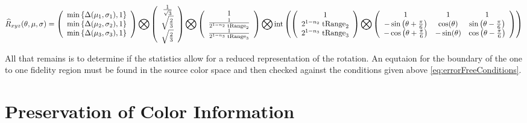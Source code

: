 \begin{equation}
\widehat{R}_{xyz}(\theta,\mu,\sigma) =
\left(
\begin{array}{c}
\min\left\{\Delta(\mu_1,\sigma_1), 1 \right\} \\
\min\left\{\Delta(\mu_2,\sigma_2), 1 \right\}  \\
\min\left\{\Delta(\mu_3,\sigma_3), 1 \right\}  \\
\end{array}
\right)
\bigotimes
\left(
\begin{array}{c}
 \frac{1}{\sqrt{3}} \\
 \sqrt{\frac{2}{3}}  \\
 \sqrt{\frac{2}{3}} \\
\end{array}
\right) \bigotimes
\left(
\begin{array}{c}
 1 \\
 \frac{1}{2^{1-n_2} \; \text{tRange}_2} \\
 \frac{1}{2^{1-n_3} \; \text{tRange}_3} \\
\end{array}
\right) 
\bigotimes
\text{int}\left(
\left(
\begin{array}{c}
 1 \\
 2^{1-n_2} \; \text{tRange}_2\\
 2^{1-n_3} \; \text{tRange}_3 \\
\end{array}
\right) 
\bigotimes
\left(
\begin{array}{ccc}
 1 & 1 & 1 \\
 -\sin \left(\theta +\frac{\pi }{6}\right) &  \cos (\theta ) &  \sin \left(\theta -\frac{\pi }{6}\right) \\
 -\cos \left(\theta +\frac{\pi }{6}\right) & - \sin (\theta ) & \cos \left(\theta -\frac{\pi }{6}\right) \\
\end{array}
\right)
\right)
\end{equation}

All that remains is to determine if the statistics allow for a reduced representation of the rotation. An equtaion for the boundary of the one to one fidelity region must be found in the source color space and then checked against the conditions given above \ref{eq:errorFreeConditions}. 

\section{Preservation of Color Information}\label{sec:PreservationOfColorInformation}

